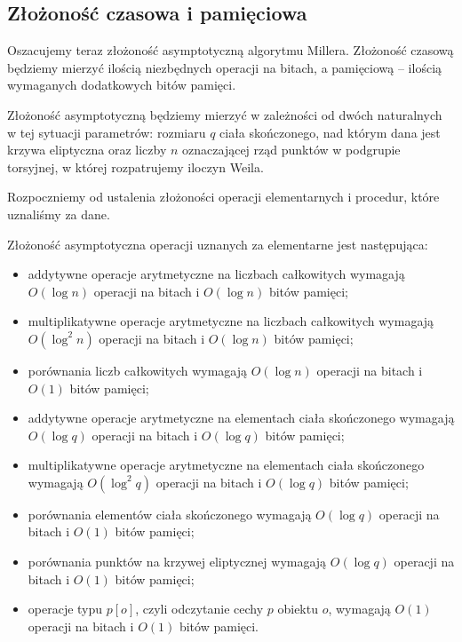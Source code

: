 \subsection*{Złożoność czasowa i pamięciowa}

\noindent
Oszacujemy teraz złożoność asymptotyczną algorytmu Millera.
Złożoność czasową będziemy mierzyć ilością niezbędnych operacji na bitach,
a pamięciową -- ilością wymaganych dodatkowych bitów pamięci.

\begin{remark}
Złożoność asymptotyczną będziemy mierzyć
w zależności od dwóch naturalnych w tej sytuacji parametrów:
rozmiaru $q$ ciała skończonego, nad którym dana jest krzywa eliptyczna
oraz liczby $n$ oznaczającej rząd punktów w podgrupie torsyjnej,
w której rozpatrujemy iloczyn Weila.
\end{remark}

\noindent
Rozpoczniemy od ustalenia złożoności operacji elementarnych
i procedur, które uznaliśmy za dane.

\begin{remark}
Złożoność asymptotyczna operacji uznanych za elementarne jest następująca:
\begin{itemize}
\item
addytywne operacje arytmetyczne na liczbach całkowitych wymagają
$O(\log n)$ operacji na bitach i $O(\log n)$ bitów pamięci;
\item
multiplikatywne operacje arytmetyczne na liczbach całkowitych wymagają
$O(\log^2 n)$ operacji na bitach i $O(\log n)$ bitów pamięci;
\item
porównania liczb całkowitych wymagają
$O(\log n)$ operacji na bitach i $O(1)$ bitów pamięci;
\item
addytywne operacje arytmetyczne na elementach ciała skończonego wymagają
$O(\log q)$ operacji na bitach i $O(\log q)$ bitów pamięci;
\item
multiplikatywne operacje arytmetyczne na elementach ciała skończonego wymagają
$O(\log^2 q)$ operacji na bitach i $O(\log q)$ bitów pamięci;
\item
porównania elementów ciała skończonego wymagają
$O(\log q)$ operacji na bitach i $O(1)$ bitów pamięci;
\item
porównania punktów na krzywej eliptycznej wymagają
$O(\log q)$ operacji na bitach i $O(1)$ bitów pamięci;
\item
operacje typu $p[o]$, czyli odczytanie cechy $p$ obiektu $o$, wymagają
$O(1)$ operacji na bitach i $O(1)$ bitów pamięci.
\end{itemize}
\end{remark}

